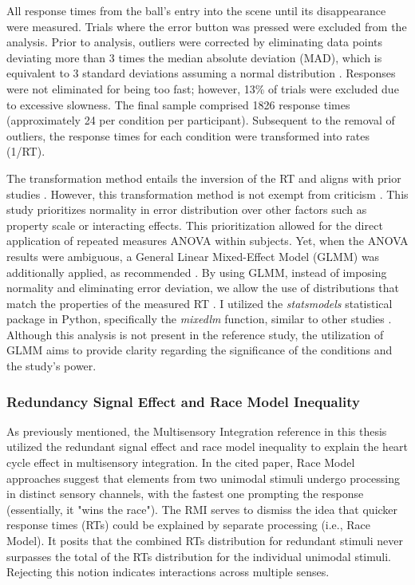 \documentclass[12pt,oneside,openright]{report}
\begin{document}
All response times from the ball's entry into the scene until its disappearance were measured. Trials where the error button was pressed were excluded from the analysis. Prior to analysis, outliers were corrected by eliminating data points deviating more than 3 times the median absolute deviation (MAD), which is equivalent to 3 standard deviations assuming a normal distribution \parencite{Innes2019ACA}. Responses were not eliminated for being too fast; however, 13\% of trials were excluded due to excessive slowness. The final sample comprised 1826 response times (approximately 24 per condition per participant). Subsequent to the removal of outliers, the response times for each condition were transformed into rates (1/RT).

The transformation method entails the inversion of the RT and aligns with prior studies \parencite{Innes2019ACA}. However, this transformation method is not exempt from criticism \parencite{Lo2015-fv}. This study prioritizes normality in error distribution over other factors such as property scale or interacting effects. This prioritization allowed for the direct application of repeated measures ANOVA within subjects. Yet, when the ANOVA results were ambiguous, a General Linear Mixed-Effect Model (GLMM) was additionally applied, as recommended \parencite{Lo2015-fv}. By using GLMM, instead of imposing normality and eliminating error deviation, we allow the use of distributions that match the properties of the measured RT \parencite{Lo2015-fv}. I utilized the \textit{statsmodels} statistical package in Python, specifically the \textit{mixedlm} function, similar to other studies \parencite{RSE_FBI}. Although this analysis is not present in the reference study, the utilization of GLMM aims to provide clarity regarding the significance of the conditions and the study's power.

\subsubsection*{Redundancy Signal Effect and Race Model Inequality}

As previously mentioned, the Multisensory Integration reference in this thesis utilized the redundant signal effect and race model inequality to explain the heart cycle effect in multisensory integration. In the cited paper, Race Model approaches suggest that elements from two unimodal stimuli undergo processing in distinct sensory channels, with the fastest one prompting the response (essentially, it "wins the race"). The RMI serves to dismiss the idea that quicker response times (RTs) could be explained by separate processing (i.e., Race Model). It posits that the combined RTs distribution for redundant stimuli never surpasses the total of the RTs distribution for the individual unimodal stimuli. Rejecting this notion indicates interactions across multiple senses.
\end{document}

